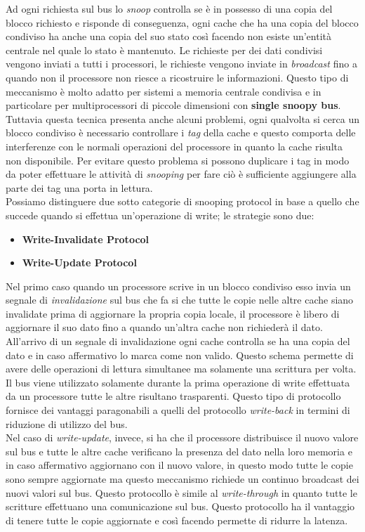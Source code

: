 Ad ogni richiesta sul bus lo \emph{snoop} controlla se è in possesso di una copia del blocco richiesto e risponde di conseguenza, ogni cache che ha una copia del blocco condiviso ha anche una copia del suo stato così facendo non esiste un'entità centrale nel quale lo stato è mantenuto. Le richieste per dei dati condivisi vengono inviati a tutti i processori, le richieste vengono inviate in \emph{broadcast} fino a quando non il processore non riesce a ricostruire le informazioni. Questo tipo di meccanismo è molto adatto per sistemi a memoria centrale condivisa e in particolare per multiprocessori di piccole dimensioni con \textbf{single snoopy bus}. Tuttavia questa tecnica presenta anche alcuni problemi, ogni qualvolta si cerca un blocco condiviso è necessario controllare i \emph{tag} della cache e questo comporta delle interferenze con le normali operazioni del processore in quanto la cache risulta non disponibile. Per evitare questo problema si possono duplicare i tag in modo da poter effettuare le attività di \emph{snooping} per fare ciò è sufficiente aggiungere alla parte dei tag una porta in lettura.\\
Possiamo distinguere due sotto categorie di snooping protocol in base a quello che succede quando si effettua un'operazione di write; le strategie sono due:
\begin{itemize}
\item \textbf{Write-Invalidate Protocol}
\item \textbf{Write-Update Protocol}
\end{itemize}
Nel primo caso  quando un processore scrive in un blocco condiviso esso invia un segnale di \emph{invalidazione} sul bus che fa si che tutte le copie nelle altre cache siano invalidate prima di aggiornare la propria copia locale, il processore è libero di aggiornare il suo dato fino a quando un'altra cache non richiederà il dato. All'arrivo di un segnale di invalidazione ogni cache controlla se ha una copia del dato e in caso affermativo lo marca come non valido. Questo schema permette di avere delle operazioni di lettura simultanee ma solamente una scrittura per volta. Il bus viene utilizzato solamente durante la prima operazione di write effettuata da un processore tutte le altre risultano trasparenti. Questo tipo di protocollo fornisce dei vantaggi paragonabili a quelli del protocollo \emph{write-back} in termini di riduzione di utilizzo del bus.\\
Nel caso di \emph{write-update}, invece, si ha che il processore distribuisce il nuovo valore sul bus e tutte le altre cache verificano la presenza del dato nella loro memoria e in caso affermativo aggiornano con il nuovo valore, in questo modo tutte le copie sono sempre aggiornate ma questo meccanismo richiede un continuo broadcast dei nuovi valori sul bus. Questo protocollo è simile al \emph{write-through} in quanto tutte le scritture effettuano una comunicazione sul bus. Questo protocollo ha il vantaggio di tenere tutte le copie aggiornate e così facendo permette di ridurre la latenza.\\
